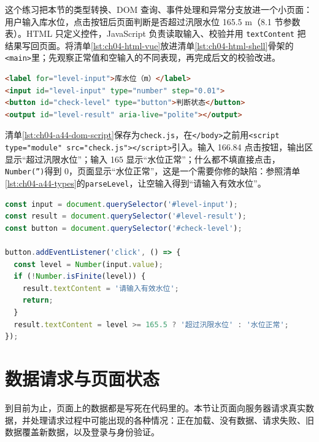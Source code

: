 这个练习把本节的类型转换、DOM 查询、事件处理和异常分支放进一个小页面：用户输入库水位，点击按钮后页面判断是否超过汛限水位 165.5 m（8.1 节参数表）。HTML 只定义控件，JavaScript 负责读取输入、校验并用 \texttt{textContent} 把结果写回页面。将清单\ref{lst:ch04-html-vue}放进清单\ref{lst:ch04-html-shell}骨架的\texttt{<main>}里；先观察正常值和空输入的不同表现，再完成后文的校验改进。

\begin{lstlisting}[label={lst:ch04-html-vue},language=html,caption={测站输入 HTML 片段}]
<label for="level-input">库水位（m）</label>
<input id="level-input" type="number" step="0.01">
<button id="check-level" type="button">判断状态</button>
<output id="level-result" aria-live="polite"></output>
\end{lstlisting}

清单\ref{lst:ch04-a44-dom-script}保存为\texttt{check.js}，在\texttt{</body>}之前用\texttt{<script type="module"}\allowbreak\texttt{ src="check.js">}\allowbreak\texttt{</script>}引入。输入 166.84 点击按钮，输出区显示“超过汛限水位”；输入 165 显示“水位正常”；什么都不填直接点击，\texttt{Number('')}得到 0，页面显示“水位正常”，这是一个需要你修的缺陷：参照清单\ref{lst:ch04-a44-types}的\texttt{parseLevel}，让空输入得到“请输入有效水位”。

\begin{lstlisting}[label={lst:ch04-a44-dom-script},language=JavaScript,caption={测站输入 JavaScript 片段}]
const input = document.querySelector('#level-input');
const result = document.querySelector('#level-result');
const button = document.querySelector('#check-level');

button.addEventListener('click', () => {
  const level = Number(input.value);
  if (!Number.isFinite(level)) {
    result.textContent = '请输入有效水位';
    return;
  }
  result.textContent = level >= 165.5 ? '超过汛限水位' : '水位正常';
});
\end{lstlisting}

\section{数据请求与页面状态}\label{sec:ch04-request-state}

到目前为止，页面上的数据都是写死在代码里的。本节让页面向服务器请求真实数据，并处理请求过程中可能出现的各种情况：正在加载、没有数据、请求失败、旧数据覆盖新数据，以及登录与身份验证。


